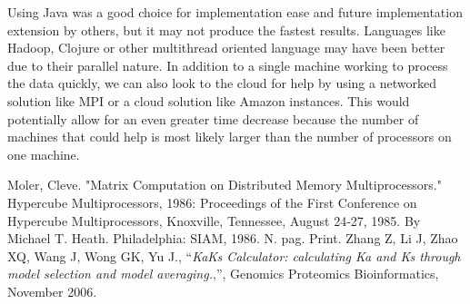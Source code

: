 \documentclass[12pt]{article}
\begin{document}
Using Java was a good choice for implementation ease and future implementation
extension by others, but it may not produce the fastest results. Languages
like Hadoop, Clojure or other multithread oriented language may have been better
due to their parallel nature. In addition to a single machine working to process
the data quickly, we can also look to the cloud for help by using a networked 
solution like MPI or a cloud solution like Amazon instances. This would
potentially allow for an even greater time decrease because the number of
machines that could help is most likely larger than the number of processors on
one machine.

\begin{thebibliography}{1}
Moler, Cleve. "Matrix Computation on Distributed Memory Multiprocessors."
Hypercube Multiprocessors, 1986: Proceedings of the First Conference on
Hypercube Multiprocessors, Knoxville, Tennessee, August 24-27, 1985. By Michael
T. Heath. Philadelphia: SIAM, 1986. N. pag. Print.
Zhang Z, Li J, Zhao XQ, Wang J, Wong GK, Yu J., ``\emph{KaKs Calculator: 
calculating Ka and Ks through model selection and model averaging.},'',
Genomics Proteomics Bioinformatics, November 2006.
\end{thebibliography}
\end{document}
